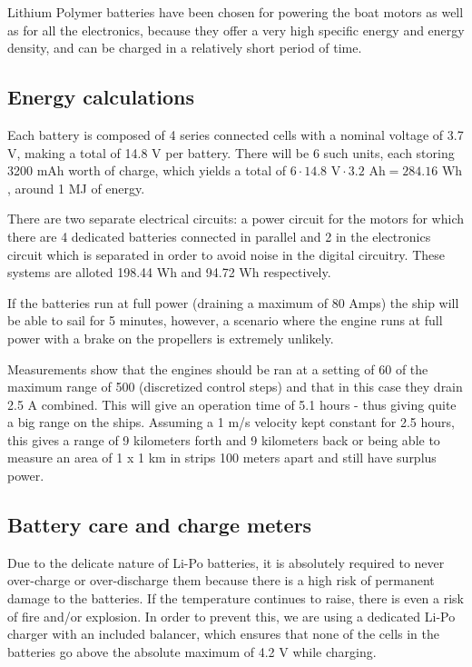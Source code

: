 	Lithium Polymer batteries have been chosen for powering the boat motors as well as for all the electronics, because they offer a very high specific energy and energy density, and can be charged in a relatively short period of time. 

\subsection{Energy calculations}
	
	Each battery is composed of 4 series connected cells with a nominal voltage of 3.7 V, making a total of 14.8 V per battery. There will be 6 such units, each storing 3200 mAh worth of charge, which yields a total of $ 6 \cdot 14.8 \text{ V} \cdot 3.2\text{ Ah} = 284.16 \text{ Wh} $, around 1 MJ of energy.
	
	There are two separate electrical circuits: a power circuit for the motors for which there are 4 dedicated batteries connected in parallel and 2 in the electronics circuit which is separated in order to avoid noise in the digital circuitry. These systems are alloted 198.44 Wh and 94.72 Wh respectively.
	
	If the batteries run at full power (draining a maximum of 80 Amps) the ship will be able to sail for 5 minutes, however, a scenario where the engine runs at full power with a brake on the propellers is extremely unlikely.
	
	Measurements show that the engines should be ran at a setting of 60 of the maximum range of 500 (discretized control steps) and that in this case they drain 2.5 A combined. This will give an operation time of 5.1 hours - thus giving quite a big range on the ships. Assuming a 1 m/s velocity kept constant for 2.5 hours, this gives a range of 9 kilometers forth and 9 kilometers back or being able to measure an area of 1 x 1 km in strips 100 meters apart and still have surplus power.
	
	\subsection{Battery care and charge meters}
	
	Due to the delicate nature of Li-Po batteries, it is absolutely required to never over-charge or over-discharge them because there is a high risk of permanent damage to the batteries. If the temperature continues to raise, there is even a risk of fire and/or explosion. In order to prevent this, we are using a dedicated Li-Po charger with an included balancer, which ensures that none of the cells in the batteries go above the absolute maximum of 4.2 V while charging.
	
